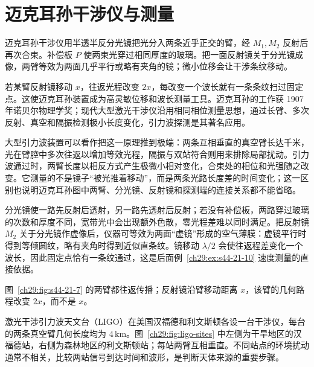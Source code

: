 \section{迈克耳孙干涉仪与测量}



迈克耳孙干涉仪用半透半反分光镜把光分入两条近乎正交的臂，经 $M_1,M_2$ 反射后再次合束。补偿板 $P$ 使两束光穿过相同厚度的玻璃。把一面反射镜关于分光镜成像，两臂等效为两面几乎平行或略有夹角的镜；微小位移会让干涉条纹移动。

若某臂反射镜移动 $x$，往返光程改变 $2x$，每改变一个波长就有一条条纹扫过固定点。这使迈克耳孙装置成为高灵敏位移和波长测量工具。迈克耳孙的工作获 1907 年诺贝尔物理学奖；现代大型激光干涉仪沿用相同相位测量思想，通过长臂、多次反射、真空和隔振检测极小长度变化，引力波探测是其著名应用。

大型引力波装置可以看作把这一原理推到极端：两条互相垂直的真空臂长达千米，光在臂腔中多次往返以增加等效光程，隔振与双站符合则用来排除局部扰动。引力波通过时，两臂长度以相反方式产生极微小相对变化，合束处的相位和光强随之改变。它测量的不是镜子“被光推着移动”，而是两条光路长度差的时间变化；这一区别也说明迈克耳孙图中两臂、分光镜、反射镜和探测端的连接关系都不能省略。

分光镜使一路先反射后透射，另一路先透射后反射；若没有补偿板，两路穿过玻璃的次数和厚度不同，宽带光中会出现额外色散，零光程差难以同时满足。把反射镜 $M_2$ 关于分光镜作虚像后，仪器可等效为两面“虚镜”形成的空气薄膜：虚镜平行时得到等倾圆纹，略有夹角时得到近似直条纹。镜移动 $\lambda/2$ 会使往返程差变化一个波长，因此固定点恰有一条纹通过，这是后面例~\ref{ch29:ex:s44-21-10} 速度测量的直接依据。

\MichelsonDiagram
图~\ref{ch29:fig:s44-21-7} 的两臂都往返传播；反射镜沿臂移动距离 $x$，该臂的几何路程改变 $2x$，而不是 $x$。

激光干涉引力波天文台（LIGO）在美国汉福德和利文斯顿各设一台干涉仪，每台的两条真空臂几何长度均为 $4\,\mathrm{km}$。图~\ref{ch29:fig:ligo-sites} 中左侧为干旱地区的汉福德站，右侧为森林地区的利文斯顿站；每站两臂互相垂直。不同站点的环境扰动通常不相关，比较两站信号到达时间和波形，是判断天体来源的重要步骤。


\begin{center}\begin{minipage}{\linewidth}\centering{}\end{minipage}\end{center}

